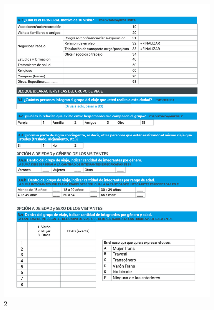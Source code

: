\documentclass[
]{book}
\begin{document}
\begin{figure}

{\centering \includegraphics[width=1\linewidth]{imagenes/graf02} 

}

\caption{2}\label{fig:002}
\end{figure}
\end{document}
